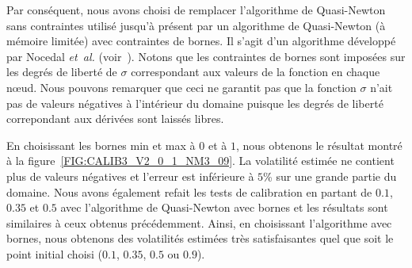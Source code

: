 Par cons\'equent, nous avons choisi de remplacer l'algorithme 
de Quasi-Newton sans contraintes utilis\'e jusqu'\`a pr\'esent 
par un algorithme de Quasi-Newton (\`a m\'emoire limit\'ee) avec 
contraintes de bornes. Il s'agit d'un algorithme d\'evelopp\'e 
par Nocedal {\em et~al.} (voir~\cite{noce:siam:95,noce:acm:97}). 
Notons que les contraintes de bornes sont impos\'ees sur les 
degr\'es de libert\'e de $\sigma$ correspondant aux valeurs 
de la fonction en chaque n{\oe}ud. Nous pouvons remarquer 
que ceci ne garantit pas que la fonction $\sigma$ n'ait pas de 
valeurs n\'egatives \`a l'int\'erieur du domaine puisque les 
degr\'es de libert\'e correpondant aux d\'eriv\'ees sont laiss\'es 
libres. 

En choisissant les bornes min et max \`a $0$ et \`a $1$, nous 
obtenons le r\'esultat montr\'e \`a la 
figure~\ref{FIG:CALIB3_V2_0_1_NM3_09}. La volatilit\'e estim\'ee 
ne contient plus de valeurs n\'egatives et l'erreur est inf\'erieure 
\`a $5$\% sur une grande partie du domaine. Nous avons 
\'egalement refait les tests de calibration en 
partant de $0.1$, $0.35$ et $0.5$ avec l'algorithme de Quasi-Newton 
avec bornes et les r\'esultats sont similaires \`a ceux obtenus 
pr\'ec\'edemment. Ainsi, en choisissant l'algorithme avec bornes, 
nous obtenons des volatilit\'es estim\'ees tr\`es satisfaisantes 
quel que soit le point initial choisi ($0.1$, $0.35$, $0.5$ ou 
$0.9$).

\pagebreak

